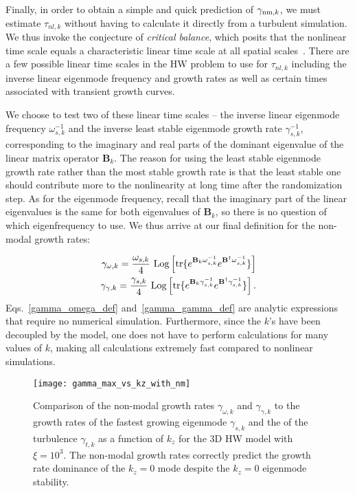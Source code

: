\documentclass[twocolumn,showkeys,superscriptaddress]{revtex4}
\def\beqar{\begin{eqnarray}}
\def\eeqar{\end{eqnarray}}
\begin{document}
Finally, in order to obtain a simple and quick prediction of $\gamma_{{\rm{nm}},k}$, we must estimate $\tau_{nl,k}$ without having to calculate it directly from a turbulent simulation. 
We thus invoke the conjecture of \emph{critical balance}, which posits that the nonlinear time scale equals a characteristic linear time scale at all spatial scales~\cite{schekochihin2012}. 
There are a few possible linear time scales in the HW problem to use for $\tau_{nl,k}$ 
including the inverse linear eigenmode frequency and growth rates as well as certain times associated with transient growth curves.

We choose to test two of these linear time scales -- the inverse linear eigenmode frequency $\omega_{s,k}^{-1}$ and the inverse least stable eigenmode growth rate $\gamma_{s,k}^{-1}$, corresponding to the imaginary and real parts
of the dominant eigenvalue of the linear matrix operator $\mathbf{B}_k$.
The reason for using the least stable eigenmode growth rate rather than the most stable growth rate is that the least stable one should contribute more to the nonlinearity at long time after the randomization step.
As for the eigenmode frequency, recall that the imaginary part of the linear eigenvalues is the same for both eigenvalues of $\mathbf{B}_k$, so there is no question of which eigenfrequency to use. 
We thus arrive at our final definition for the non-modal growth rates:

\beqar
\label{gamma_omega_def}
\gamma_{\omega,k} = \frac{\omega_{s,k}}{4} \ {\rm{Log}} \left[ {\rm{tr}} \{ e^{\mathbf{B}_k \omega_{s,k}^{-1}} e^{\mathbf{B}^{\dagger} \omega_{s,k}^{-1}} \} \right] \\
\label{gamma_gamma_def}
\gamma_{\gamma,k} = \frac{\gamma_{s,k}}{4} \ {\rm{Log}} \left[ {\rm{tr}} \{ e^{\mathbf{B}_k \gamma_{s,k}^{-1}} e^{\mathbf{B}^{\dagger} \gamma_{s,k}^{-1}} \} \right].
\eeqar
Eqs.~\ref{gamma_omega_def} and~\ref{gamma_gamma_def} are analytic expressions that require no numerical simulation. 
Furthermore, since the $k$'s have been decoupled by the model, one does not have to perform calculations for many values of $k$, making all calculations extremely fast compared to nonlinear simulations.

\begin{figure}
\centerline{\texttt{[image: gamma\_max\_vs\_kz\_with\_nm]}}
\caption{Comparison of the non-modal growth rates $\gamma_{\omega,k}$ and $\gamma_{\gamma,k}$ to the growth rates of the fastest growing eigenmode $\gamma_{s,k}$ 
and the of the turbulence $\gamma_{t,k}$ as a function of $k_z$ for the 3D HW model with $\xi = 10^3$. The non-modal growth rates correctly predict the growth rate dominance of the $k_z=0$ mode
despite the $k_z=0$ eigenmode stability.}
\label{gamma_max_vs_kz_with_nm}
\end{figure}
\end{document}
